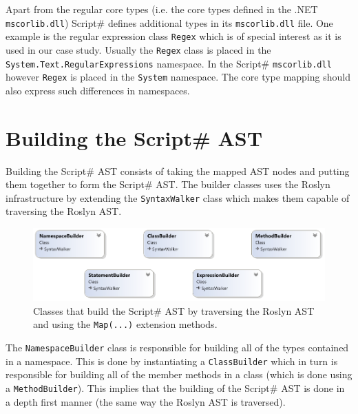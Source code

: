			Apart from the regular core types (i.e. the core types defined in the .NET \texttt{mscorlib.dll}) Script\# defines additional types in its \texttt{mscorlib.dll} file. One example is the regular expression class \texttt{Regex} which is of special interest as it is used in our case study. Usually the \texttt{Regex} class is placed in the \texttt{System.Text.RegularExpressions} namespace. In the Script\# \texttt{mscorlib.dll} however \texttt{Regex} is placed in the \texttt{System} namespace. The core type mapping should also express such differences in namespaces.

\section{Building the Script\# AST} %
\label{sec:building_the_scriptsharp_ast}
	Building the Script\# AST consists of taking the mapped AST nodes and putting them together to form the Script\# AST. The builder classes uses the Roslyn infrastructure by extending the \texttt{SyntaxWalker} class which makes them capable of traversing the Roslyn AST.
	\begin{figure}[H]
		\begin{center}
			\centerline{\includegraphics[width=16cm]{resources/images/BuilderClasses.png}}
		\end{center}
		\caption{Classes that build the Script\# AST by traversing the Roslyn AST and using the \texttt{Map(...)} extension methods.}
		\label{builderClasses}
	\end{figure}

	The \texttt{NamespaceBuilder} class is responsible for building all of the types contained in a namespace. This is done by instantiating a \texttt{ClassBuilder} which in turn is responsible for building all of the member methods in a class (which is done using a \texttt{MethodBuilder}). This implies that the building of the Script\# AST is done in a depth first manner (the same way the Roslyn AST is traversed).  

